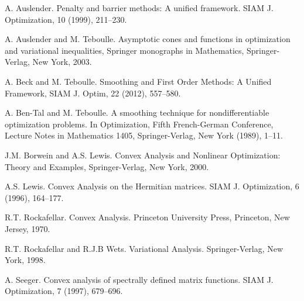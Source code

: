 \documentclass[a4paper,11pt, oneside]{book}
\theoremstyle{definition}
\begin{document}
\begin{thebibliography}{99}
    A. Auslender. Penalty and barrier methods: A unified framework. SIAM J. Optimization, 10 (1999), 211--230.

  A. Auslender and M. Teboulle. Asymptotic cones and functions in optimization and variational inequalities, Springer monographs in Mathematics, Springer-Verlag, New York, 2003.

  A. Beck and M. Teboulle. Smoothing and First Order Methods: A Unified Framework, SIAM J. Optim, 22 (2012), 557--580.

  A. Ben-Tal and M. Teboulle. A smoothing technique for nondifferentiable optimization problems. In Optimization, Fifth French-German Conference, Lecture Notes in Mathematics 1405, Springer-Verlag, New York (1989), 1--11.

  J.M. Borwein and A.S. Lewis. Convex Analysis and Nonlinear Optimization: Theory and Examples, Springer-Verlag, New York, 2000.

  A.S. Lewis. Convex Analysis on the Hermitian matrices. SIAM J. Optimization, 6 (1996), 164--177.

  R.T. Rockafellar. Convex Analysis. Princeton University Press, Princeton, New Jersey, 1970.

  R.T. Rockafellar and R.J.B Wets. Variational Analysis. Springer-Verlag, New York, 1998.

  A. Seeger. Convex analysis of spectrally defined matrix functions. SIAM J. Optimization, 7 (1997), 679--696.

  \end{thebibliography}
\end{document}
